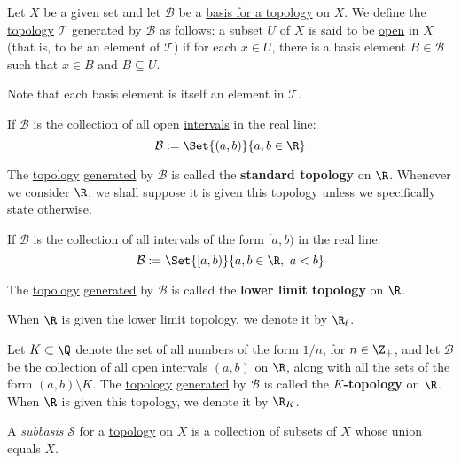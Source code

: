 \label{e6b5306}

Let $X$ be a given set and let $\mathcal B$ be a \href{e896402}{basis for a
topology} on $X$. We define the \href{cc8eb8b}{topology} $\mathcal T$ generated
by $\mathcal B$ as follows: a subset $U$ of $X$ is said to be
\href{c4490f8}{open} in $X$ (that is, to be an element of $\mathcal T$) if for
each $x\in U$, there is a basis element $B\in\mathcal B$ such that $x\in B$ and
$B\subseteq U$.

Note that each basis element is itself an element in $\mathcal T$.

\label{ad37a51}

If $\mathcal B$ is the collection of all open \href{c65e94a}{intervals} in the
real line:
$$
  \mathcal B:=\Set{(a,b)}{a,b\in\R}
$$

The \href{cc8eb8b}{topology} \href{e6b5306}{generated} by $\mathcal B$ is
called the \textbf{standard topology} on $\R$. Whenever we consider $\R$, we
shall suppose it is given this topology unless we specifically state otherwise.

\label{cefed4f}

If $\mathcal B$ is the collection of all intervals of the form $[a,b)$ in the
real line:
$$
  \mathcal B:=\Set{[a,b)}{a,b\in\R,\ a<b}
$$

The \href{cc8eb8b}{topology} \href{e6b5306}{generated} by $\mathcal B$ is
called the \textbf{lower limit topology} on $\R$.

When $\R$ is given the lower limit topology, we denote it by $\R_\ell$.

\label{ee5d783}

Let $K\subset\Q$ denote the set of all numbers of the form $1/n$, for
$n\in\Z_+$, and let $\mathcal B$ be the collection of all open
\href{c65e94a}{intervals} $(a,b)$ on $\R$, along with all the sets of the form
$(a,b)\setminus K$. The \href{cc8eb8b}{topology} \href{e6b5306}{generated} by
$\mathcal B$ is called the $K$\textbf{-topology} on $\R$. When $\R$ is given
this topology, we denote it by $\R_K$.

\label{aba7b48}

A \textit{subbasis} $\mathcal S$ for a \href{cc8eb8b}{topology} on $X$ is a
collection of subsets of $X$ whose union equals $X$.

